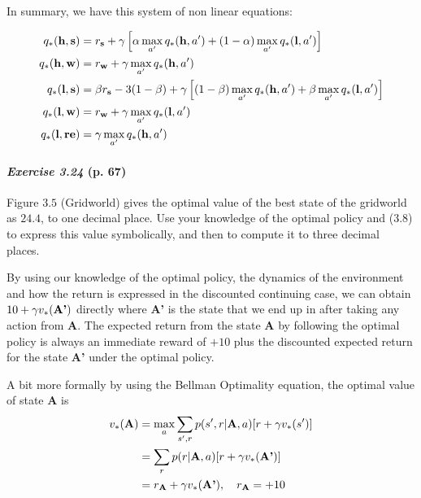 \documentclass[10pt,a4paper]{article}
\begin{document}
In summary, we have this system of non linear equations:

\begin{equation}
\begin{split}
q_*(\textrm{\textbf{h}}, \textrm{\textbf{s}}) &= r_\textrm{\textbf{s}} + \gamma \left[\alpha \max_{a'} q_*(\textrm{\textbf{h}}, a') + (1-\alpha) \max_{a'} q_*(\textrm{\textbf{l}}, a')\right]\\
q_*(\textrm{\textbf{h}}, \textrm{\textbf{w}}) &=  r_\textrm{\textbf{w}} + \gamma \max_{a'} q_*(\textrm{\textbf{h}}, a')\\
q_*(\textrm{\textbf{l}}, \textrm{\textbf{s}}) &= \beta r_\textrm{\textbf{s}} - 3 (1-\beta) + \gamma \left[(1-\beta) \max_{a'} q_*(\textrm{\textbf{h}}, a') + \beta \max_{a'} q_*(\textrm{\textbf{l}}, a')\right]\\
q_*(\textrm{\textbf{l}}, \textrm{\textbf{w}}) &=  r_\textrm{\textbf{w}} + \gamma \max_{a'} q_*(\textrm{\textbf{l}}, a')\\
q_*(\textrm{\textbf{l}}, \textrm{\textbf{re}}) &= \gamma \max_{a'} q_*(\textrm{\textbf{h}}, a')
\end{split}
\end{equation}


\paragraph{\textit{Exercise 3.24} (p. 67)} Figure $3.5$ (Gridworld) gives the optimal value of the best state of the gridworld as $24.4$, to one decimal place. Use your knowledge of the optimal policy and ($3.8$) to express this value symbolically, and then to compute it to three decimal places.

\bigskip
By using our knowledge of the optimal policy, the dynamics of the environment and how the return is expressed in the discounted continuing case, we can obtain $10 + \gamma v_*(\textrm{\textbf{A'}})$ directly where \textbf{A'} is the state that we end up in after taking any action from \textbf{A}. The expected return from the state \textbf{A} by following the optimal policy is always an immediate reward of $+10$ plus the discounted expected return for the state \textbf{A'} under the optimal policy.

\bigskip
A bit more formally by using the Bellman Optimality equation, the optimal value of state \textbf{A} is
\begin{equation}
\begin{split}
v_*(\textrm{\textbf{A}}) &= \max_{a} \sum_{s', r} p(s', r \lvert \textrm{\textbf{A}}, a) [r + \gamma v_*(s')]\\
&= \sum_{r} p(r \lvert \textrm{\textbf{A}}, a) [r + \gamma v_*(\textrm{\textbf{A'}})]\\
&= r_\textrm{\textbf{A}} + \gamma v_*(\textrm{\textbf{A'}}),\quad r_\textrm{\textbf{A}} = +10
\end{split}
\end{equation}
\end{document}
